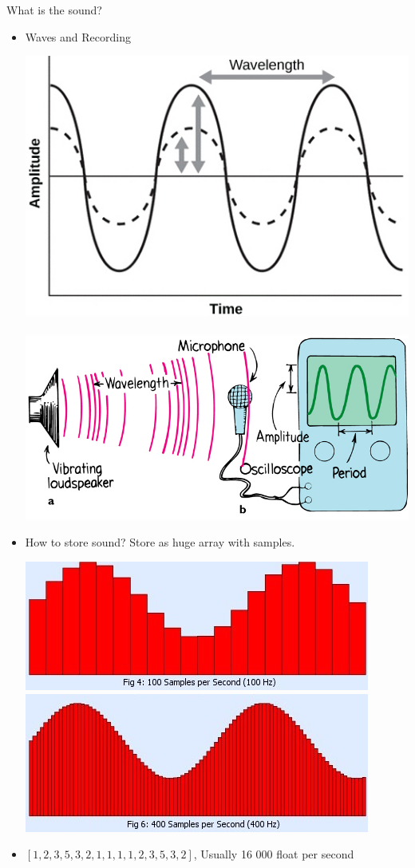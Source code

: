 \documentclass{beamer}
\begin{document}
\begin{frame}{What is the sound?} 
	\begin{itemize}
		\item Waves and Recording
			\begin{center}		  
				\includegraphics[scale=0.25]{img/wave} ~~~ 	\includegraphics[scale=0.2]{img/sound}
			\end{center}
		\item How to store sound? Store as huge array with samples.
		\begin{center}
			\includegraphics[scale=0.35]{img/sf1}~~~~\includegraphics[scale=0.35]{img/sf2} 
		\end{center}
		\item $[1, 2, 3, 5, 3, 2, 1, 1, 1, 1, 2, 3, 5, 3, 2]$, Usually 16 000 float per second
	\end{itemize}
\end{frame}
\end{document}
